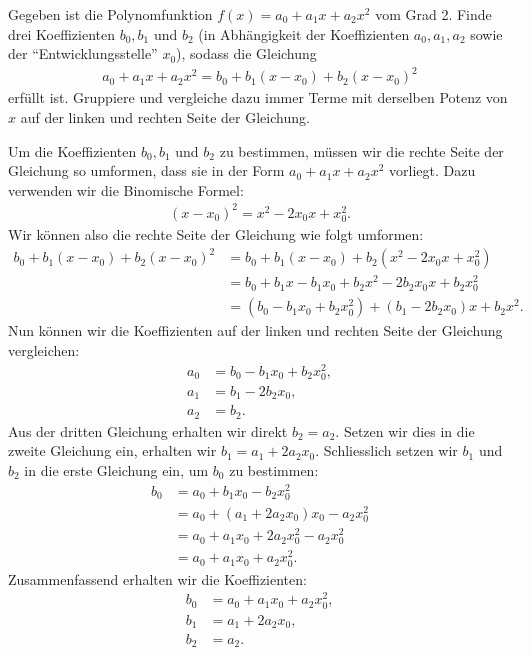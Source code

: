 \begin{myexercise}\label{myexercise:KoeffizientenVergleich2}
  Gegeben ist die Polynomfunktion $f(x) = a_0 + a_1x + a_2x^2$ vom Grad 2. Finde drei Koeffizienten $b_0, b_1$ und $b_2$ (in Abhängigkeit der Koeffizienten $a_0, a_1, a_2$ sowie der \enquote{Entwicklungsstelle} $x_0$), sodass die Gleichung
  \begin{align*}
    a_0 + a_1x + a_2x^2 = b_0 + b_1(x-x_0) + b_2(x-x_0)^2
  \end{align*}
  erfüllt ist. Gruppiere und vergleiche dazu immer Terme mit derselben Potenz von $x$ auf der linken und rechten Seite der Gleichung.
  \begin{myanswer}
    Um die Koeffizienten $b_0, b_1$ und $b_2$ zu bestimmen, müssen wir die rechte Seite der Gleichung so umformen, dass sie in der Form $a_0 + a_1x + a_2x^2$ vorliegt. Dazu verwenden wir die Binomische Formel:
    \begin{align*}
      (x-x_0)^2 = x^2 - 2x_0x + x_0^2.
    \end{align*}
    Wir können also die rechte Seite der Gleichung wie folgt umformen:
    \begin{align*}
      b_0 + b_1(x-x_0) + b_2(x-x_0)^2 &= b_0 + b_1(x-x_0) + b_2(x^2 - 2x_0x + x_0^2) \\
      &= b_0 + b_1x - b_1x_0 + b_2x^2 - 2b_2x_0x + b_2x_0^2 \\
      &= (b_0 - b_1x_0 + b_2x_0^2) + (b_1 - 2b_2x_0)x + b_2x^2.
    \end{align*}
    Nun können wir die Koeffizienten auf der linken und rechten Seite der Gleichung vergleichen:
    \begin{align*}
      a_0 &= b_0 - b_1x_0 + b_2x_0^2, \\
      a_1 &= b_1 - 2b_2x_0, \\
      a_2 &= b_2.
    \end{align*}
    Aus der dritten Gleichung erhalten wir direkt $b_2 = a_2$. Setzen wir dies in die zweite Gleichung ein, erhalten wir $b_1 = a_1 + 2a_2x_0$. Schliesslich setzen wir $b_1$ und $b_2$ in die erste Gleichung ein, um $b_0$ zu bestimmen:
    \begin{align*}
      b_0 &= a_0 + b_1x_0 - b_2x_0^2 \\
      &= a_0 + (a_1 + 2a_2x_0)x_0 - a_2x_0^2 \\
      &= a_0 + a_1x_0 + 2a_2x_0^2 - a_2x_0^2 \\
      &= a_0 + a_1x_0 + a_2x_0^2.
    \end{align*}
    Zusammenfassend erhalten wir die Koeffizienten:
    \begin{align*}
      b_0 &= a_0 + a_1x_0 + a_2x_0^2, \\
      b_1 &= a_1 + 2a_2x_0, \\
      b_2 &= a_2.
    \end{align*}
  \end{myanswer}
\end{myexercise}

